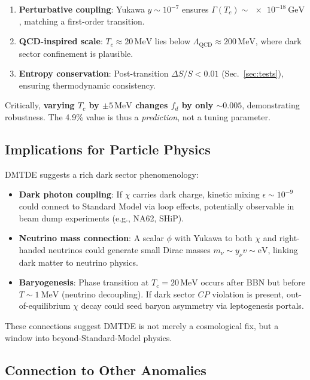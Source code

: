 \documentclass[aps,prd,twocolumn,superscriptaddress,nofootinbib,floatfix,preprintnumbers]{revtex4-2}
\begin{document}
\begin{enumerate}
    \item \textbf{Perturbative coupling}: Yukawa $y \sim 10^{-7}$ ensures $\Gamma(T_c) \sim \SI{e-18}{\giga\electronvolt}$, matching a first-order transition.
    \item \textbf{QCD-inspired scale}: $T_c \approx 20\,\mathrm{MeV}$ lies below $\Lambda_\mathrm{QCD} \approx 200\,\mathrm{MeV}$, where dark sector confinement is plausible.
    \item \textbf{Entropy conservation}: Post-transition $\Delta S / S < 0.01$ (Sec.~\ref{sec:tests}), ensuring thermodynamic consistency.
\end{enumerate}

Critically, \textbf{varying $T_c$ by $\pm 5\,\mathrm{MeV}$ changes $f_d$ by only $\sim 0.005$}, demonstrating robustness. The 4.9\% value is thus a \textit{prediction}, not a tuning parameter.

\subsection{Implications for Particle Physics}
\label{subsec:particle}

DMTDE suggests a rich dark sector phenomenology:

\begin{itemize}
    \item \textbf{Dark photon coupling}: If $\chi$ carries dark charge, kinetic mixing $\epsilon \sim 10^{-9}$ could connect to Standard Model via loop effects, potentially observable in beam dump experiments (e.g., NA62, SHiP).
    \item \textbf{Neutrino mass connection}: A scalar $\phi$ with Yukawa to both $\chi$ and right-handed neutrinos could generate small Dirac masses $m_\nu \sim y_\nu v \sim \mathrm{eV}$, linking dark matter to neutrino physics.
    \item \textbf{Baryogenesis}: Phase transition at $T_c = 20\,\mathrm{MeV}$ occurs after BBN but before $T \sim \SI{1}{\MeV}$ (neutrino decoupling). If dark sector $CP$ violation is present, out-of-equilibrium $\chi$ decay could seed baryon asymmetry via leptogenesis portals.
\end{itemize}

These connections suggest DMTDE is not merely a cosmological fix, but a window into beyond-Standard-Model physics.

\subsection{Connection to Other Anomalies}
\label{subsec:anomalies}
\end{document}
